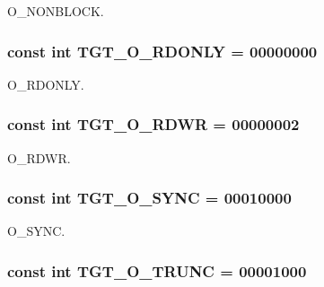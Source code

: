 O\_\-NONBLOCK. \hypertarget{classX86Linux32_ad266b23a0ae07d1833e18bae651f3411}{
\subsubsection[{TGT\_\-O\_\-RDONLY}]{\setlength{\rightskip}{0pt plus 5cm}const int {\bf TGT\_\-O\_\-RDONLY} = 00000000}}
\label{classX86Linux32_ad266b23a0ae07d1833e18bae651f3411}


O\_\-RDONLY. \hypertarget{classX86Linux32_ac6fa9ecf5d2f3314f197698f1099e2ac}{
\subsubsection[{TGT\_\-O\_\-RDWR}]{\setlength{\rightskip}{0pt plus 5cm}const int {\bf TGT\_\-O\_\-RDWR} = 00000002}}
\label{classX86Linux32_ac6fa9ecf5d2f3314f197698f1099e2ac}


O\_\-RDWR. \hypertarget{classX86Linux32_abf43ab05d2a5b6b8113952160d8565db}{
\subsubsection[{TGT\_\-O\_\-SYNC}]{\setlength{\rightskip}{0pt plus 5cm}const int {\bf TGT\_\-O\_\-SYNC} = 00010000}}
\label{classX86Linux32_abf43ab05d2a5b6b8113952160d8565db}


O\_\-SYNC. \hypertarget{classX86Linux32_a4f892ee6e1424a2becd859b0bef1f18b}{
\subsubsection[{TGT\_\-O\_\-TRUNC}]{\setlength{\rightskip}{0pt plus 5cm}const int {\bf TGT\_\-O\_\-TRUNC} = 00001000}}
\label{classX86Linux32_a4f892ee6e1424a2becd859b0bef1f18b}



